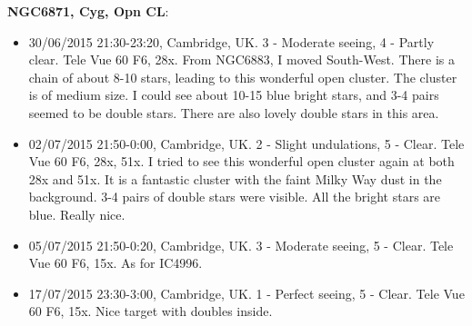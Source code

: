 {\bf NGC6871, Cyg, Opn CL}:
\begin{itemize}
\item 30/06/2015 21:30-23:20, Cambridge, UK. 3 - Moderate seeing, 4 - Partly clear. Tele Vue 60 F6, 28x. From NGC6883, I moved South-West. There is a chain of about 8-10 stars, leading to this wonderful open cluster. The cluster is of medium size. I could see about 10-15 blue bright stars, and 3-4 pairs seemed to be double stars. There are also lovely double stars in this area.
\item 02/07/2015 21:50-0:00, Cambridge, UK. 2 - Slight undulations, 5 - Clear. Tele Vue 60 F6, 28x, 51x. I tried to see this wonderful open cluster again at both 28x and 51x. It is a fantastic cluster with the faint Milky Way dust in the background. 3-4 pairs of double stars were visible. All the bright stars are blue. Really nice.
\item 05/07/2015 21:50-0:20, Cambridge, UK. 3 - Moderate seeing, 5 - Clear. Tele Vue 60 F6, 15x. As for IC4996.
\item 17/07/2015 23:30-3:00, Cambridge, UK. 1 - Perfect seeing, 5 - Clear. Tele Vue 60 F6, 15x. Nice target with doubles inside. 
\end{itemize}
